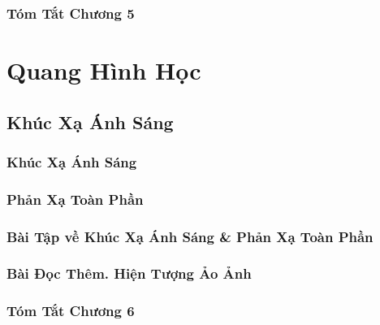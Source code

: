 \documentclass[oneside]{book}
\numberwithin{equation}{section}
\begin{document}

\section{Tóm Tắt Chương 5}


\part{Quang Hình Học}

\chapter{Khúc Xạ Ánh Sáng}

\section{Khúc Xạ Ánh Sáng}


\section{Phản Xạ Toàn Phần}


\section{Bài Tập về Khúc Xạ Ánh Sáng \& Phản Xạ Toàn Phần}


\section{Bài Đọc Thêm. Hiện Tượng Ảo Ảnh}


\section{Tóm Tắt Chương 6}

\end{document}
